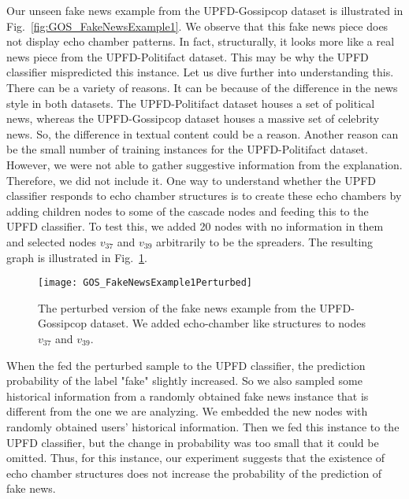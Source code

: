 Our unseen fake news example from the UPFD-Gossipcop dataset is illustrated in Fig.~\ref{fig:GOS_FakeNewsExample1}. We observe that this fake news piece does not display echo chamber patterns. In fact, structurally, it looks more like a real news piece from the UPFD-Politifact dataset. This may be why the UPFD classifier mispredicted this instance. Let us dive further into understanding this. There can be a variety of reasons. It can be because of the difference in the news style in both datasets. The UPFD-Politifact dataset houses a set of political news, whereas the UPFD-Gossipcop dataset houses a massive set of celebrity news. So, the difference in textual content could be a reason. Another reason can be the small number of training instances for the UPFD-Politifact dataset. However, we were not able to gather suggestive information from the explanation. Therefore, we did not include it. One way to understand whether the UPFD classifier responds to echo chamber structures is to create these echo chambers by adding children nodes to some of the cascade nodes and feeding this to the UPFD classifier. To test this, we added 20 nodes with no information in them and selected nodes $v_{37}$ and $v_{39}$ arbitrarily to be the spreaders. The resulting graph is illustrated in Fig.~\ref{fig:GOS_FakeNewsExample1Perturbed}.
\begin{figure}
    \centering
    \texttt{[image: GOS\_FakeNewsExample1Perturbed]}
    \caption[The perturbed version of the fake news example from the UPFD-Gossipcop dataset.]{The perturbed version of the fake news example from the UPFD-Gossipcop dataset. We added echo-chamber like structures to nodes $v_{37}$ and $v_{39}$.}
    \label{fig:GOS_FakeNewsExample1Perturbed}
\end{figure}
When the fed the perturbed sample to the UPFD classifier, the prediction probability of the label "fake" slightly increased. So we also sampled some historical information from a randomly obtained fake news instance that is different from the one we are analyzing. We embedded the new nodes with randomly obtained users' historical information. Then we fed this instance to the UPFD classifier, but the change in probability was too small that it could be omitted. Thus, for this instance, our experiment suggests that the existence of echo chamber structures does not increase the probability of the prediction of fake news.\\
